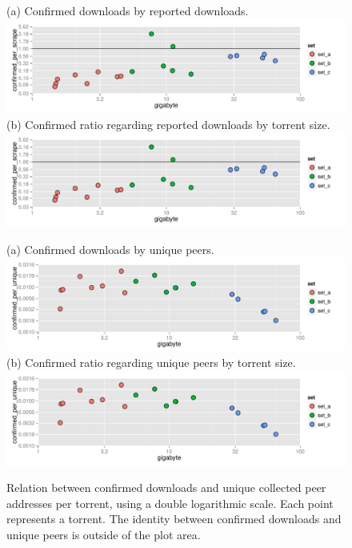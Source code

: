\documentclass[10pt, a4paper, twoside=false, headsepline]{scrbook}
\renewcommand{\_}{\origunderscore\allowbreak}
\begin{document}
\begin{figure}
\centering
{\small (a) Confirmed downloads by reported downloads.}
\includegraphics[width=\textwidth, page=2]{../result/2015-08-30_20-combined_download_confirmed_scrape}
{\small (b) Confirmed ratio regarding reported downloads by torrent size.}
\includegraphics[width=\textwidth, page=1]{../result/2015-08-30_20-combined_download_confirmed_scrape}
\caption[Download numbers: Confirmed vs. scrape request]{Relation between confirmed downloads and tracker reported download numbers from scrape requests per torrent, using a double logarithmic scale. Each point represents a torrent. The black lines mark the identity between confirmed and reported downloads.}
\label{confirmed-scrape}
\vspace{1cm}
{\small (a) Confirmed downloads by unique peers.}
\includegraphics[width=\textwidth, page=2]{../result/2015-08-30_20-combined_download_confirmed_unique}
{\small (b) Confirmed ratio regarding unique peers by torrent size.}
\includegraphics[width=\textwidth, page=1]{../result/2015-08-30_20-combined_download_confirmed_unique}
\caption[Download numbers: Confirmed vs. unique peers]{Relation between confirmed downloads and unique collected peer addresses per torrent, using a double logarithmic scale. Each point represents a torrent. The identity between confirmed downloads and unique peers is outside of the plot area.}
\label{confirmed-unique}
\end{figure}
\end{document}

